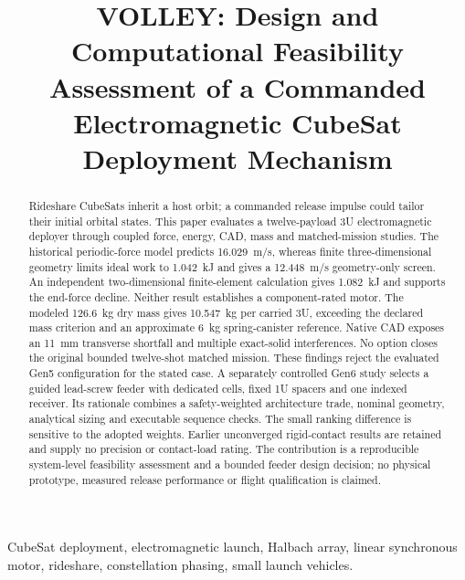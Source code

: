 \documentclass[conference]{IEEEtran}
\begin{document}
\title{VOLLEY: Design and Computational Feasibility Assessment of a Commanded Electromagnetic CubeSat Deployment Mechanism}

\author{
}

\maketitle

\begin{abstract}
Rideshare CubeSats inherit a host orbit; a commanded release impulse could tailor their initial orbital states. This paper evaluates a twelve-payload 3U electromagnetic deployer through coupled force, energy, CAD, mass and matched-mission studies. The historical periodic-force model predicts 16.029~m/s, whereas finite three-dimensional geometry limits ideal work to 1.042~kJ and gives a 12.448~m/s geometry-only screen. An independent two-dimensional finite-element calculation gives 1.082~kJ and supports the end-force decline. Neither result establishes a component-rated motor. The modeled 126.6~kg dry mass gives 10.547~kg per carried 3U, exceeding the declared mass criterion and an approximate 6~kg spring-canister reference. Native CAD exposes an 11~mm transverse shortfall and multiple exact-solid interferences. No option closes the original bounded twelve-shot matched mission. These findings reject the evaluated Gen5 configuration for the stated case. A separately controlled Gen6 study selects a guided lead-screw feeder with dedicated cells, fixed 1U spacers and one indexed receiver. Its rationale combines a safety-weighted architecture trade, nominal geometry, analytical sizing and executable sequence checks. The small ranking difference is sensitive to the adopted weights. Earlier unconverged rigid-contact results are retained and supply no precision or contact-load rating. The contribution is a reproducible system-level feasibility assessment and a bounded feeder design decision; no physical prototype, measured release performance or flight qualification is claimed.
\end{abstract}

\begin{IEEEkeywords}
CubeSat deployment, electromagnetic launch, Halbach array, linear synchronous motor, rideshare, constellation phasing, small launch vehicles.
\end{IEEEkeywords}
\end{document}
